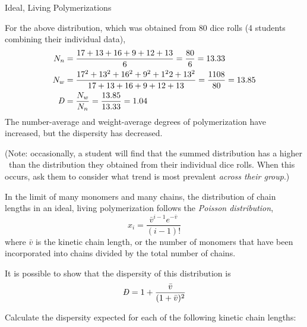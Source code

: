 \begin{activity}{Ideal, Living Polymerizations}
\begin{ctqs}
		\begin{solution}[3in]{}
			For the above distribution, which was obtained from 80 dice rolls (4 students combining their individual data),
			\begin{align*}
				N_n &= \frac{17+13+16+9+12+13}{6} = \frac{80}{6} = 13.33\\
				N_w &= \frac{17^2+13^2+16^2+9^2+1^22+13^2}{17+13+16+9+12+13} = \frac{1108}{80} = 13.85\\
				\PDImath &= \frac{N_w}{N_n} = \frac{13.85}{13.33} = 1.04
			\end{align*}
			The number-average and weight-average degrees of polymerization have increased, but the dispersity has decreased.
			
			(Note: occasionally, a student will find that the summed distribution has a higher \PDItext\ than the distribution they obtained from their individual dice rolls.  When this occurs, ask them to consider what trend is most prevalent \emph{across their group}.)
		\end{solution}
	
\end{ctqs}

\begin{infobox}

	In the limit of many monomers and many chains, the distribution of chain lengths in an ideal, living polymerization follows the \emph{Poisson distribution},
	\begin{equation*}
		x_i = \frac{\bar v^{i-1}e^{-\bar v}}{(i-1)!}
	\end{equation*}
	where $\bar v$ is the kinetic chain length, or the number of monomers that have been incorporated into chains divided by the total number of chains.
	
	It is possible to show that the dispersity of this distribution is
	\begin{equation*}
		\PDImath = 1+\frac{\bar v}{(1+\bar v)^2}
	\end{equation*}

	\label{\labelbase:infobox:poisson}

\end{infobox}

\begin{ctqs}

	\question Calculate the dispersity expected for each of the following kinetic chain lengths: \label{\labelbase:ctq:poissondispersities}
	
		\begin{enumerate}
		

\end{enumerate}
\end{ctqs}
\end{activity}
